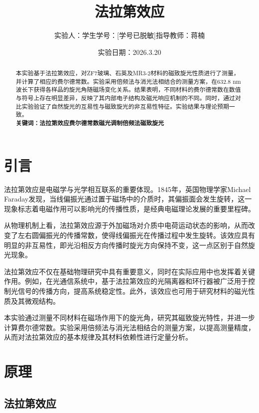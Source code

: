 \documentclass[a4paper, 1.5lines]{ctexart}
\title{法拉第效应}
\author{实验人：学生\qquad 学号：[学号已脱敏]\qquad 指导教师：蒋楠}
\date{实验日期：2026.3.20}
\begin{document}
    
    \maketitle
    
    \begin{abstract}
         
        本实验基于法拉第效应，对ZF7玻璃、石英及MR3-2材料的磁致旋光性质进行了测量，并计算了相应的费尔德常数。实验采用倍频法与消光法相结合的测量方案，在632.8 nm波长下获得各样品的旋光角随磁场变化关系。结果表明，不同材料的费尔德常数在数值与符号上存在明显差异，反映了其内部电子结构及磁光响应机制的不同。同时，通过对比实验验证了自然旋光的互易性与磁致旋光的非互易性特征。实验结果与理论预期一致。\\
        \textbf{\textbf{关键词：法拉第效应\quad 费尔德常数\quad 磁光调制倍频法\quad 磁致旋光}}
    \end{abstract}
    
    \section{引言}

    法拉第效应是电磁学与光学相互联系的重要体现。1845年，英国物理学家Michael Faraday发现，当线偏振光通过置于磁场中的介质时，其偏振面会发生旋转，这一现象标志着电磁作用可以影响光的传播性质，是经典电磁理论发展的重要里程碑。

    从物理机制上看，法拉第效应源于外加磁场对介质中电荷运动状态的影响，从而改变了左右圆偏振光的传播常数，使得线偏振光在传播过程中发生旋转。该效应具有明显的非互易性，即光沿相反方向传播时旋光方向保持不变，这一点区别于自然旋光现象。

    法拉第效应不仅在基础物理研究中具有重要意义，同时在实际应用中也发挥着关键作用。例如，在光通信系统中，基于法拉第效应的光隔离器和环行器被广泛用于控制光信号的传播方向，提高系统稳定性。此外，该效应也可用于研究材料的磁光性质及其微观结构。

    本实验通过测量不同材料在磁场作用下的旋光角，研究其磁致旋光特性，并进一步计算费尔德常数。实验采用倍频法与消光法相结合的测量方案，以提高测量精度，从而对法拉第效应的基本规律及其材料依赖性进行定量分析。
    
    \section{原理}

\subsection{法拉第效应}
\end{document}
